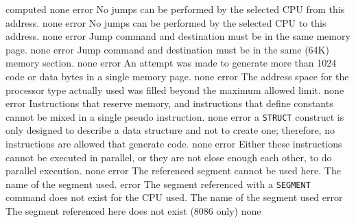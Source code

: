 \documentclass[12pt,twoside]{report}
\newcommand{\tty}[1]{{\tt #1}}
\begin{document}
\begin{description}
{                computed}
               {none}
               {error}
               {No jumps can be performed by the selected CPU from this
                address.}
               {none}
               {error}
               {No jumps can be performed by the selected CPU to this
                address.}
               {none}
               {error}
               {Jump command and destination must be in the same memory
                page.}
               {none}
               {error}
               {Jump command and destination must be in the same (64K)
                memory section.}
               {none}
               {error}
               {An attempt was made to generate more than 1024 code or
                data bytes in a single memory page.}
               {none}
               {error}
               {The address space for the processor type actually used was
                filled beyond the maximum allowed limit.}
               {none}
               {error}
               {Instructions that reserve memory, and instructions that define
                constants cannot be mixed in a single pseudo instruction.}
               {none}
               {error}
               {a \tty{STRUCT} construct is only designed to describe a
                data structure and not to create one; therefore, no
                instructions are allowed that generate code.}
               {none}
               {error}
               {Either these instructions cannot be executed in parallel,
                or they are not close enough each other, to do parallel
                execution.}
               {none}
               {error}
               {The referenced segment cannot be used here.}
               {The name of the segment used.}
               {error}
               {The segment referenced with a \tty{SEGMENT} command does not
                exist for the CPU used.}
               {The name of the segment used}
               {error}
               {The segment referenced here does not exist (8086 only)}
               {none}

\end{description}
\end{document}
